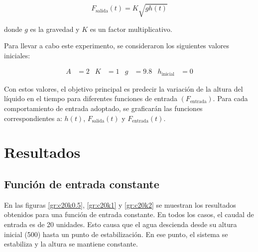 \documentclass[12pt]{article}
\newcommand{\fent}{F_\text{entrada}}
\newcommand{\fsal}{F_\text{salida}}
\begin{document}
\[ \fsal(t) = K \sqrt{g h(t)} \]

donde $g$ es la gravedad y $K$ es un factor multiplicativo.

Para llevar a cabo este experimento, se consideraron los siguientes valores iniciales:

\begin{align*}
	A & = 2 & K & = 1 & g & = 9.8 & h_\text{inicial} & = 0
\end{align*}

Con estos valores, el objetivo principal es predecir la variación de la altura del líquido en el tiempo para diferentes funciones de entrada $(\fent)$. Para cada comportamiento de entrada adoptado, se graficarán las funciones correspondientes a: $h(t)$, $\fsal(t)$ y $\fent(t)$.


\section*{Resultados}


\subsection*{Función de entrada constante}

En las figuras \ref{gr:c20k0.5}, \ref{gr:c20k1} y \ref{gr:c20k2} se muestran los resultados obtenidos para una función de entrada constante. En todos los casos, el caudal de entrada es de 20 unidades. Esto causa que el agua descienda desde su altura inicial (500) hasta un punto de estabilización. En ese punto, el sistema se estabiliza y la altura se mantiene constante.
\end{document}

